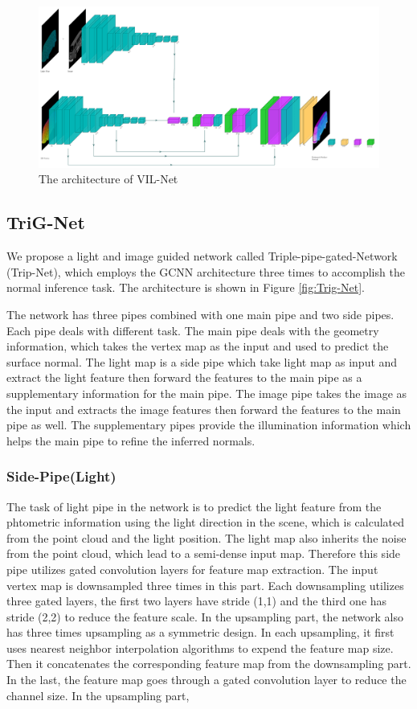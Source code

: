 \documentclass[border=15pt, multi, tikz]{article}
\begin{document}
\begin{figure}
	\centering
	\includegraphics[width=1\textwidth]{Figures/vil-net} %
	\caption{The architecture of VIL-Net}
	\label{fig:VIL-Net}
\end{figure}


\subsection{TriG-Net}

We propose a light and image guided network called Triple-pipe-gated-Network (Trip-Net), which employs the GCNN architecture three times to accomplish the normal inference task. The architecture is shown in Figure \ref{fig:Trig-Net}.

The network has three pipes combined with one main pipe and two side pipes. Each pipe deals with different task. The main pipe deals with the geometry information, which takes the vertex map as the input and used to predict the surface normal. The light map is a side pipe which take light map as input and extract the light feature then forward the features to the main pipe as a supplementary information for the main pipe. The image pipe takes the image as the input and extracts the image features then forward the features to the main pipe as well. The supplementary pipes provide the illumination information which helps the main pipe to refine the inferred normals.
\subsubsection{Side-Pipe(Light)}
The task of light pipe in the network is to predict the light feature from the phtometric information using the light direction in the scene, which is calculated from the point cloud and the light position. The light map also inherits the noise from the point cloud, which lead to a semi-dense input map. Therefore this side pipe utilizes gated convolution layers for feature map extraction. The input vertex map is downsampled three times in this part. Each downsampling utilizes three gated layers, the first two layers have stride (1,1) and the third one has stride (2,2) to reduce the feature scale. 
In the upsampling part, the network also has three times upsampling as a symmetric design. In each upsampling, it first uses nearest neighbor interpolation algorithms to expend the feature map size. Then it concatenates the corresponding feature map from the downsampling part. In the last, the feature map goes through a gated convolution layer to reduce the channel size. In the upsampling part, 
\end{document}
